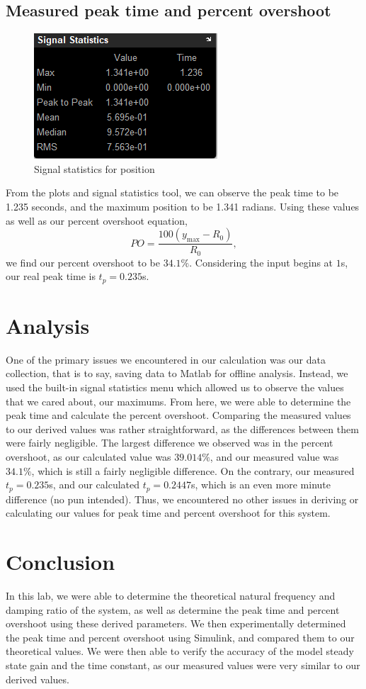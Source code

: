 \documentclass{article}
\begin{document}
\subsection{Measured peak time and percent overshoot}
\begin{figure} [H]
    \centering
    \includegraphics[width=0.5\linewidth]{measured.png}
    \caption{Signal statistics for position}
    \label{fig:statistics}
\end{figure}
From the plots and signal statistics tool, we can observe the peak time to be 1.235 seconds, and the maximum position to be 1.341 radians. Using these values as well as our percent overshoot equation,
\begin{equation}
    PO=\frac {100(y_{\text{max}}-R_0)}{R_0},
\end{equation}
we find our percent overshoot to be $34.1\%$. Considering the input begins at $1$s, our real peak time is $t_p=0.235$s.

\section{Analysis}
One of the primary issues we encountered in our calculation was our data collection, that is to say, saving data to Matlab for offline analysis. Instead, we used the built-in signal statistics menu which allowed us to observe the values that we cared about, our maximums. From here, we were able to determine the peak time and calculate the percent overshoot. Comparing the measured values to our derived values was rather straightforward, as the differences between them were fairly negligible. The largest difference we observed was in the percent overshoot, as our calculated value was $39.014\%$, and our measured value was $34.1\%$, which is still a fairly negligible difference. On the contrary, our measured $t_p=0.235$s, and our calculated $t_p=0.2447$s, which is an even more minute difference (no pun intended). Thus, we encountered no other issues in deriving or calculating our values for peak time and percent overshoot for this system.

\section{Conclusion}
In this lab, we were able to determine the theoretical natural frequency and damping ratio of the system, as well as determine the peak time and percent overshoot using these derived parameters. We then experimentally determined the peak time and percent overshoot using Simulink, and compared them to our theoretical values. We were then able to verify the accuracy of the model steady state gain and the time constant, as our measured values were very similar to our derived values.
\end{document}
